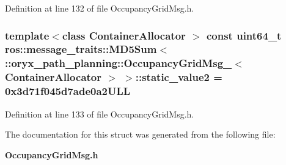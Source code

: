 \-Definition at line 132 of file \-Occupancy\-Grid\-Msg.\-h.

\subsubsection[{static\-\_\-value2}]{\setlength{\rightskip}{0pt plus 5cm}template$<$class Container\-Allocator $>$ const uint64\-\_\-t ros\-::message\-\_\-traits\-::\-M\-D5\-Sum$<$ \-::{\bf oryx\-\_\-path\-\_\-planning\-::\-Occupancy\-Grid\-Msg\-\_\-}$<$ \-Container\-Allocator $>$ $>$\-::{\bf static\-\_\-value2} = 0x3d71f045d7ade0a2\-U\-L\-L\hspace{0.3cm}{\ttfamily  [static]}}\label{structros_1_1message__traits_1_1MD5Sum_3_01_1_1oryx__path__planning_1_1OccupancyGridMsg___3_01ContainerAllocator_01_4_01_4_a6038f601a9d402510ec015f02264e0f3}


\-Definition at line 133 of file \-Occupancy\-Grid\-Msg.\-h.



\-The documentation for this struct was generated from the following file\-:\begin{DoxyCompactItemize}
\item 
{\bf \-Occupancy\-Grid\-Msg.\-h}\end{DoxyCompactItemize}
